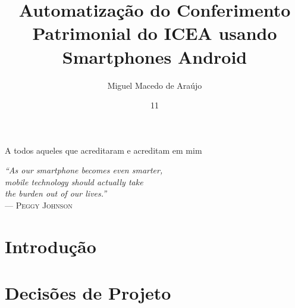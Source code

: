 \documentclass[tg]{ita}    %
\author{Miguel Macedo de Araújo}{Neto}
\title{Automatização do Conferimento Patrimonial do ICEA usando Smartphones Android}
\date{11}{junho}{2018}
\begin{document}
\maketitle

\begin{itadedication}
A todos aqueles que acreditaram e acreditam em mim
\end{itadedication}

\begin{itathanks}

\end{itathanks}

\thispagestyle{empty}
\ifhyperref{}\fi
\begin{flushright}
\begin{spacing}{1}
\mbox{}\vfill
{\sffamily\itshape
``As our smartphone becomes even smarter,\\
mobile technology should actually take\\
the burden out of our lives.''\\}
--- \textsc{Peggy Johnson}
\end{spacing}
\end{flushright}


\begin{abstract}
\noindent

\end{abstract}

\listoffigures %


\listofabbreviations


\tableofcontents

\mainmatter

\chapter{Introdução}


\chapter{Decisões de Projeto} \label{chproj}

\end{document}
